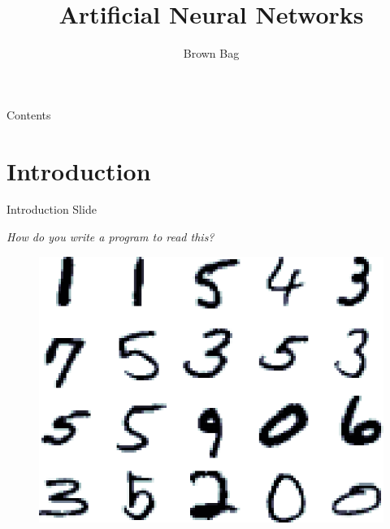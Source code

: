 \documentclass[12pt]{beamer}
\title{\sc  Artificial Neural Networks}
\subtitle{\sc Brown Bag}
\begin{document}
\begin{frame}
\maketitle
\end{frame}
\begin{frame}{\sc Contents}
\begin{center}
\tableofcontents
\end{center}
\end{frame}

\section{\sc Introduction}


\begin{frame}{\sc Introduction Slide}
\begin{center}

{\sl How do you write a program to read this?}


\begin{figure}[ht]
\includegraphics[scale=0.5]{figures/mnist_originals.png}
\end{figure}


\end{center}
\end{frame}

\end{document}
